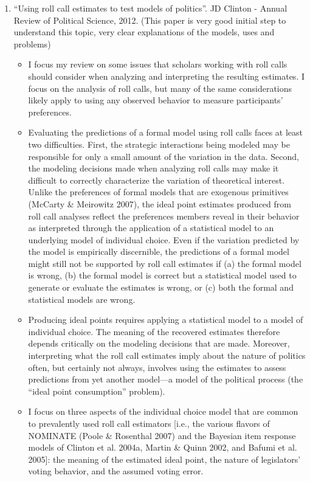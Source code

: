 \documentclass[a4paper,12pt]{article}
\begin{document}
\begin{enumerate}
\newpage

\item “Using roll call estimates to test models of politics”. JD Clinton - Annual Review of Political Science, 2012. 
(This paper is very good initial step to understand this topic, very clear explanations of the models, uses and problems)  
\begin{itemize}
\item I focus my review on some issues that scholars working with roll calls should consider when analyzing and interpreting the resulting estimates. I focus on the analysis of roll calls, but many of the same considerations likely apply to using any observed behavior to measure participants’ preferences. 
\item Evaluating the predictions of a formal model using roll calls faces at least two difficulties. First, the strategic interactions being modeled may be responsible for only a small amount of the variation in the data. Second, the modeling decisions made when analyzing roll calls may make it difficult to correctly characterize the variation of theoretical interest. Unlike the preferences of formal models that are exogenous primitives (McCarty \& Meirowitz 2007), the ideal point estimates produced from roll call analyses reflect the preferences members reveal in their behavior as interpreted through the application of a statistical model to an underlying model of individual choice. Even if the variation predicted by the model is empirically discernible, the predictions of a formal model might still not be supported by roll call estimates if (a) the formal model is wrong, (b) the formal model is correct but a statistical model used to generate or evaluate the estimates is wrong, or (c) both the formal and statistical models are wrong. 
\item Producing ideal points requires applying a statistical model to a model of individual choice. The meaning of the recovered estimates therefore depends critically on the modeling decisions that are made. Moreover, interpreting what the roll call estimates imply about the nature of politics often, but certainly not always, involves using the estimates to assess predictions from yet another model—a model of the political process (the “ideal point consumption” problem). 
\item I focus on three aspects of the individual choice model that are common to prevalently used roll call estimators [i.e., the various flavors of NOMINATE (Poole \& Rosenthal 2007) and the Bayesian item response models of Clinton et al. 2004a, Martin \& Quinn 2002, and Bafumi et al. 2005]: the meaning of the estimated ideal point, the nature of legislators’ voting behavior, and the assumed voting error.  

\end{itemize}
\end{enumerate}
\end{document}
